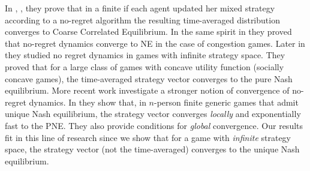 In \cite{FV97}, \cite{FS99}, \cite{HM00} they prove that in a finite
if each agent updated her mixed strategy according to a no-regret
algorithm the resulting time-averaged distribution converges to
Coarse Correlated Equilibrium. In the same spirit in \cite{BEL06}
they proved that no-regret dynamics converge to NE in the
case of congestion games. Later in \cite{EMN09} they studied no regret
dynamics in games with infinite strategy space. They proved that for a large
class of games with concave utility function (socially concave games), the
time-averaged strategy vector converges to the pure Nash equilibrium.
More recent work investigate a stronger notion of convergence of
no-regret dynamics. In \cite{CHM17} they show that,
in $n$-person finite generic games that admit unique Nash equilibrium,
the strategy vector converges \emph{locally} and exponentially fast
to the PNE. They also provide conditions for \emph{global} convergence.
Our results fit in this line of research since we show that
for a game with \emph{infinite} strategy space, the strategy vector (not the
time-averaged) converges to the unique Nash equilibrium.

